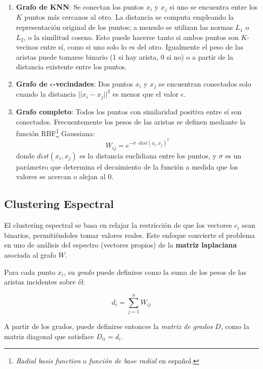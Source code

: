 \begin{enumerate}
    \item \textbf{Grafo de KNN}: Se conectan los puntos $x_i$ y $x_j$ si uno se encuentra entre los $K$ puntos más cercanos al otro.
    La distancia se computa empleando la representación original de los puntos;
    a menudo se utilizan las normas $L_1$ o $L_2$, o la similitud coseno.
    Esto puede hacerse tanto si ambos puntos son $K$-vecinos entre sí, como si uno solo lo es del otro.
    Igualmente el peso de las aristas puede tomarse binario (1 si hay arista, 0 si no) o a partir de la distancia existente entre los puntos.

    \item \textbf{Grafo de $\epsilon$-vecindades}: Dos puntos $x_i$ y $x_j$ se encuentran conectados solo cuando la distancia $|| x_i - x_j ||^2$ es menor que el valor $\epsilon$.

    \item \textbf{Grafo completo}: Todos los puntos con similaridad positiva entre sí son conectados.
    Frecuentemente los pesos de las aristas se definen mediante la función RBF\footnote{\textit{Radial basis function} o \textit{función de base radial} en español.} Gaussiana:
    \[
        W_{ij} = e^{-\sigma \cdot dist(x_i , x_j)^2}
    \]
    donde $dist(x_i , x_j)$ es la distancia euclidiana entre los puntos, y $\sigma$ es un parámetro que determina el decaimiento de la función a medida que los valores se acercan o alejan al 0.
\end{enumerate}

\subsection{Clustering Espectral}\label{subsec:clusteringEspectral}

El clustering espectral se basa en relajar la restricción de que los vectores $c_i$ sean binarios, permitiéndoles tomar valores reales.
Este enfoque convierte el problema en uno de análisis del espectro (vectores propios) de la \textbf{matriz laplaciana} asociada al grafo $W$.

Para cada punto $x_i$, su \textit{grado} puede definirse como la suma de los pesos de las aristas incidentes sobre él:

\begin{equation*}
    d_i = \sum_{j=1}^{n}{W_{ij}}
\end{equation*}

A partir de los grados, puede definirse entonces la \textit{matriz de grados} $D$, como la matriz diagonal que satisface $D_{ii}=d_i$.

